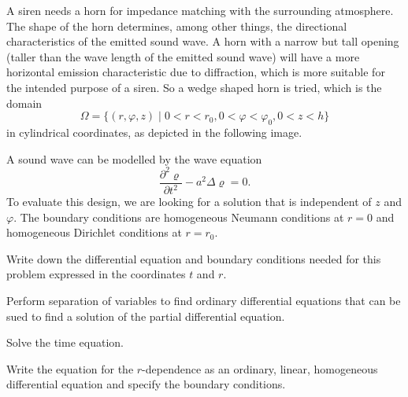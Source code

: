 A siren needs a horn for impedance matching with the surrounding
atmosphere.
The shape of the horn determines, among other things, the directional
characteristics of the emitted sound wave.
A horn with a narrow but tall opening (taller than the wave length of
the emitted sound wave) will have a more horizontal emission characteristic
due to diffraction, which is more suitable for the intended purpose of
a siren.
So a wedge shaped horn is tried, which is the domain
\[
\Omega = \{ (r,\varphi,z) \;|\; 0 < r < r_0, 0< \varphi <\varphi_0, 0 < z < h\}
\]
in cylindrical coordinates, as depicted in the following image.
\begin{center}
\end{center}
A sound wave can be modelled by the wave equation
\[
\frac{\partial^2 \varrho}{\partial t^2} - a^2\Delta \varrho=0.
\]
To evaluate this design,
we are looking for a solution that is independent of $z$ and $\varphi$.
The boundary conditions are homogeneous Neumann conditions at $r=0$ and 
homogeneous Dirichlet conditions at $r=r_0$.

\begin{teilaufgaben}
\item
Write down the differential equation and boundary conditions needed
for this problem expressed in the coordinates $t$ and $r$.
\item
Perform separation of variables to find ordinary differential equations
that can be sued to find a solution of the partial differential equation.
\item
Solve the time equation.
\item
Write the equation for the $r$-dependence as an ordinary, linear, homogeneous
differential equation and specify the boundary conditions.
\end{teilaufgaben}

